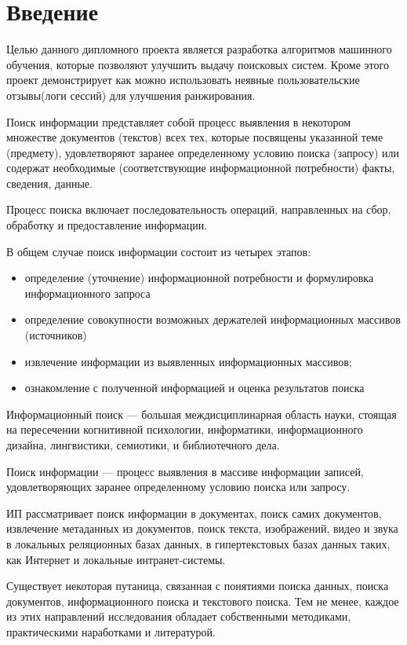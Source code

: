 \section*{Введение}

Целью данного дипломного проекта является разработка алгоритмов машинного обучения, которые позволяют улучшить выдачу поисковых систем. Кроме этого проект демонстрирует как можно использовать неявные пользовательские отзывы(логи сессий) для улучшения ранжирования. 

Поиск информации представляет собой процесс выявления в некотором множестве документов (текстов) всех тех, которые посвящены указанной теме (предмету), удовлетворяют заранее определенному условию поиска (запросу) или содержат необходимые (соответствующие информационной потребности) факты, сведения, данные.

Процесс поиска включает последовательность операций, направленных на сбор, обработку и предоставление информации.

В общем случае поиск информации состоит из четырех этапов:

\begin{itemize}
	\item определение (уточнение) информационной потребности и формулировка информационного запроса
	\item определение совокупности возможных держателей информационных массивов (источников)
	\item извлечение информации из выявленных информационных массивов;
	\item ознакомление с полученной информацией и оценка результатов поиска
\end{itemize}

Информационный поиск — большая междисциплинарная область науки, стоящая на пересечении когнитивной психологии, информатики, информационного дизайна, лингвистики, семиотики, и библиотечного дела.

Поиск информации — процесс выявления в массиве информации записей, удовлетворяющих заранее определенному условию поиска или запросу.

ИП рассматривает поиск информации в документах, поиск самих документов, извлечение метаданных из документов, поиск текста, изображений, видео и звука в локальных реляционных базах данных, в гипертекстовых базах данных таких, как Интернет и локальные интранет-системы.

Существует некоторая путаница, связанная с понятиями поиска данных, поиска документов, информационного поиска и текстового поиска. Тем не менее, каждое из этих направлений исследования обладает собственными методиками, практическими наработками и литературой.

